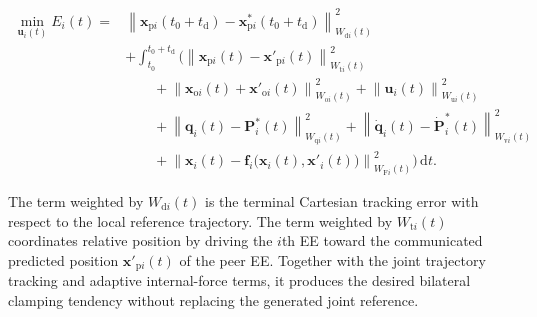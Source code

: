 

\begin{align}
\min_{\boldsymbol{u}_i(t)} E_i(t)
={}&
\left\|
\boldsymbol{x}_{\mathrm{p}i}(t_0+t_{\mathrm d})
-\boldsymbol{x}^{*}_{\mathrm{p}i}(t_0+t_{\mathrm d})
\right\|_{W_{\mathrm d i}(t)}^2
\nonumber\\
&+\int_{t_0}^{t_0+t_{\mathrm d}}
\Big(
\left\|
\boldsymbol{x}_{\mathrm{p}i}(t)
-\boldsymbol{x}'_{\mathrm{p}i}(t)
\right\|_{W_{\mathrm t i}(t)}^2
\nonumber\\
&\qquad
+\left\|
\boldsymbol{x}_{\mathrm{o}i}(t)
+\boldsymbol{x}'_{\mathrm{o}i}(t)
\right\|_{W_{\mathrm o i}(t)}^2
+\left\|\boldsymbol{u}_i(t)\right\|_{W_{\mathrm u i}(t)}^2
\nonumber\\
&\qquad
+\left\|
\boldsymbol{q}_i(t)-\boldsymbol{P}^{*}_i(t)
\right\|_{W_{\mathrm q i}(t)}^2
+\left\|
\dot{\boldsymbol{q}}_i(t)-\dot{\boldsymbol{P}}^{*}_i(t)
\right\|_{W_{\mathrm v i}(t)}^2
\nonumber\\
&\qquad
+\left\|
\boldsymbol{x}_i(t)
-\boldsymbol{f}_i\bigl(\boldsymbol{x}_i(t),
\boldsymbol{x}'_i(t)\bigr)
\right\|_{W_{\mathrm F i}(t)}^2
\Big)\,\mathrm dt .
\label{eq:MPC_cost_function_revised}
\end{align}

The term weighted by $W_{\mathrm d i}(t)$ is the terminal Cartesian
tracking error with respect to the local reference trajectory. The term
weighted by $W_{\mathrm t i}(t)$ coordinates relative position by driving the
$i$th EE toward the communicated predicted position
$\boldsymbol{x}'_{\mathrm p i}(t)$ of the peer EE. Together with the joint
trajectory tracking and adaptive internal-force terms, it produces the desired
bilateral clamping tendency without replacing the generated joint reference.


